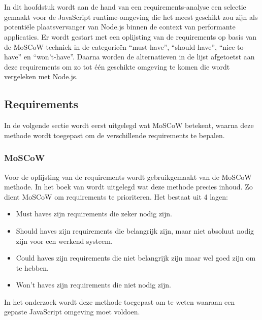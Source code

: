 
\chapter{}%
\label{ch:selectie}

In dit hoofdstuk wordt aan de hand van een requirements-analyse een selectie gemaakt voor de JavaScript runtime-omgeving 
die het meest geschikt zou zijn als potentiële plaatsvervanger van Node.js binnen de context van performante applicaties.
Er wordt gestart met een oplijsting van de requirements op basis van de MoSCoW-techniek in de categorieën “must-have”, “should-have”, “nice-to-have” en “won't-have”. 
Daarna worden de alternatieven in de lijst afgetoetst aan deze requirements om zo tot één geschikte omgeving te komen die wordt vergeleken met Node.js.

\section{Requirements}
In de volgende sectie wordt eerst uitgelegd wat MoSCoW betekent, 
waarna deze methode wordt toegepast om de verschillende requirements te bepalen.
\subsection{MoSCoW}
Voor de oplijsting van de requirements wordt gebruikgemaakt van de MoSCoW methode. 
In het boek van \textcite{Vliet2007} wordt uitgelegd wat deze methode precies inhoud. 
Zo dient MoSCoW om requirements te prioriteren. Het bestaat uit 4 lagen:
\begin{itemize}
    \item Must haves zijn requirements die zeker nodig zijn.
    \item Should haves zijn requirements die belangrijk zijn, maar niet absoluut nodig zijn voor een werkend systeem.
    \item Could haves zijn requirements die niet belangrijk zijn maar wel goed zijn om te hebben.
    \item Won't haves zijn requirements die niet nodig zijn.
\end{itemize}
In het onderzoek wordt deze methode toegepast om te weten waaraan een gepaste JavaScript omgeving moet voldoen.

